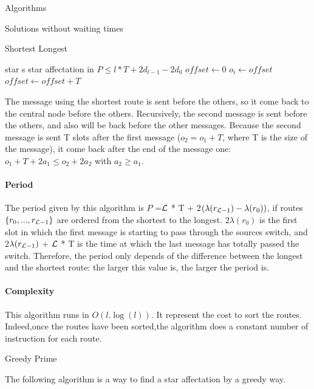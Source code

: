 \documentclass[a4paper,10pt]{report}
\begin{document}
\begin{chapter}{Algorithms}
\begin{section}{Solutions without waiting times}
\begin{subsection}{Shortest Longest}
\begin{algorithm}[H]
\caption{Star affectation from shortest to longest}
\begin{algorithmic}

\REQUIRE star s
\ENSURE star affectation in $P \le l*T + 2d_{l-1} - 2d_0$
\STATE $offset \leftarrow 0$
\STATE $o_i \leftarrow offset$
\STATE $offset \leftarrow offset+T$
\ENDFOR

\end{algorithmic}
\end{algorithm}


The message using the shortest route is sent before the others, so it come back to the central node before the others.
Recursively, the second message is sent before the others, and also will be back before the other messages. 
Because the second message is sent T slots after the first message ($o_2 = o_1 + T$, where T is the size of the message), it come back after
the end of the message one: $o_1+ T + 2a_1 \le o_2 + 2a_2$ with $a_2 \ge a_1$.

\paragraph{Period}
The period given by this algorithm is $P$ =${\cal L}$ * T + 2$(\lambda(r_{{\cal L}-1}) - \lambda(r_0))$, if routes $\{r_0,...,r_{{\cal L}-1}\}$ are ordered
from the shortest to the longest. 2$\lambda(r_0)$ is the first slot in which the first message is starting to pass through the sources switch,
and 2$\lambda(r_{{\cal L}-1})$ + ${\cal L}$ * T  is the time at which the last message has totally passed the switch.
Therefore, the period only depends of the difference between the longest and the shortest route: the larger this value is, the larger
the period is.

\paragraph{Complexity}
This algorithm runs in $O(l.\log(l))$. It represent the cost to sort the routes.
Indeed,once the routes have been sorted,the algorithm does a constant number of instruction for each route.
\end{subsection}

\begin{subsection}{Greedy Prime}

The following algorithm is a way to find a star affectation by a greedy way.


\end{subsection}
\end{section}
\end{chapter}
\end{document}
